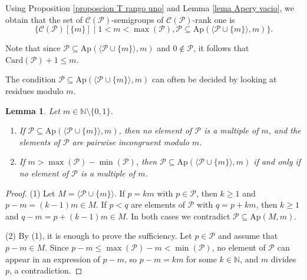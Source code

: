 \documentclass[11pt]{article}
\def\N{\mathbb{N}}
\newtheorem{lemma}[theorem]{Lemma}
\numberwithin{equation}{section}
\newcommand{\Ap}{\mathrm{Ap}}
\begin{document}
Using Proposition \ref{proposcion T rango uno} and Lemma \ref{lema Apery vacio}, we obtain that the set of $\mathcal C(\mathcal P)$-semigroups of $\mathcal C(\mathcal P)$-rank one is
\[
\{\mathcal C(\mathcal P)[\{m\}] \mid 1<m<\max(\mathcal P),\mathcal P\subseteq\mathrm{Ap}(\langle\mathcal P\cup\{m\}\rangle,m)\}.
\]

Note that since $\mathcal P\subseteq \mathrm{Ap}(\langle\mathcal P\cup\{m\}\rangle,m)$ and $0\notin\mathcal P$, it follows that $\mathrm{Card}(\mathcal P)+1\leq m$.

The condition $\mathcal P\subseteq\Ap(\langle\mathcal P\cup\{m\}\rangle,m)$ can often be decided by looking at residues modulo $m$.

\begin{lemma}\label{lema congruencias}
Let $m\in\N\setminus\{0,1\}$.
\begin{enumerate}
\item If $\mathcal P\subseteq\Ap(\langle\mathcal P\cup\{m\}\rangle,m)$, then no element of $\mathcal P$ is a multiple of $m$, and the elements of $\mathcal P$ are pairwise incongruent modulo $m$.
\item If $m>\max(\mathcal P)-\min(\mathcal P)$, then $\mathcal P\subseteq\Ap(\langle\mathcal P\cup\{m\}\rangle,m)$ if and only if no element of $\mathcal P$ is a multiple of $m$.
\end{enumerate}
\end{lemma}

\begin{proof}
(1) Let $M=\langle\mathcal P\cup\{m\}\rangle$. If $p=km$ with $p\in\mathcal P$, then $k\geq1$ and $p-m=(k-1)m\in M$. If $p<q$ are elements of $\mathcal P$ with $q=p+km$, then $k\geq 1$ and $q-m=p+(k-1)m\in M$. In both cases we contradict $\mathcal P\subseteq\Ap(M,m)$.

(2) By (1), it is enough to prove the sufficiency. Let $p\in\mathcal P$ and assume that $p-m\in M$. Since $p-m\leq\max(\mathcal P)-m<\min(\mathcal P)$, no element of $\mathcal P$ can appear in an expression of $p-m$, so $p-m=km$ for some $k\in\N$, and $m$ divides $p$, a contradiction.
\end{proof}
\end{document}
